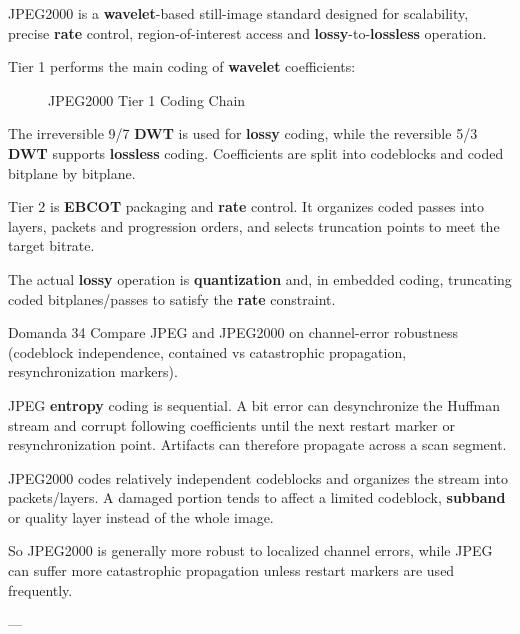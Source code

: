 JPEG2000 is a \textbf{wavelet}-based still-image standard designed for scalability, precise \textbf{rate} control, region-of-interest access and \textbf{lossy}-to-\textbf{lossless} operation.

Tier 1 performs the main coding of \textbf{wavelet} coefficients:


\begin{figure}[H]
\centering
{}
\caption{JPEG2000 Tier 1 Coding Chain}
\end{figure}


The irreversible 9/7 \textbf{DWT} is used for \textbf{lossy} coding, while the reversible 5/3 \textbf{DWT} supports \textbf{lossless} coding. Coefficients are split into codeblocks and coded bitplane by bitplane.

Tier 2 is \textbf{EBCOT} packaging and \textbf{rate} control. It organizes coded passes into layers, packets and progression orders, and selects truncation points to meet the target bitrate.

The actual \textbf{lossy} operation is \textbf{quantization} and, in embedded coding, truncating coded bitplanes/passes to satisfy the \textbf{rate} constraint.



\begin{questionbox}{Domanda 34}
Compare JPEG and JPEG2000 on channel-error robustness (codeblock independence, contained vs catastrophic propagation, resynchronization markers).
\end{questionbox}


JPEG \textbf{entropy} coding is sequential. A bit error can desynchronize the Huffman stream and corrupt following coefficients until the next restart marker or resynchronization point. Artifacts can therefore propagate across a scan segment.

JPEG2000 codes relatively independent codeblocks and organizes the stream into packets/layers. A damaged portion tends to affect a limited codeblock, \textbf{subband} or quality layer instead of the whole image.

So JPEG2000 is generally more robust to localized channel errors, while JPEG can suffer more catastrophic propagation unless restart markers are used frequently.

---



